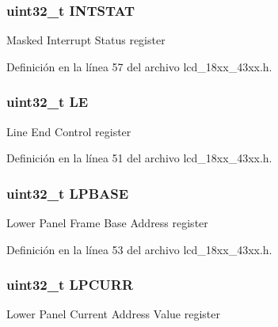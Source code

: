 \subsubsection[{\texorpdfstring{I\+N\+T\+S\+T\+AT}{INTSTAT}}]{ uint32\+\_\+t I\+N\+T\+S\+T\+AT}\hypertarget{struct_l_p_c___l_c_d___t_a0bbac120700e7e8084acf696d17068ab}{}\label{struct_l_p_c___l_c_d___t_a0bbac120700e7e8084acf696d17068ab}
Masked Interrupt Status register 

Definición en la línea 57 del archivo lcd\+\_\+18xx\+\_\+43xx.\+h.

\subsubsection[{\texorpdfstring{LE}{LE}}]{ uint32\+\_\+t LE}\hypertarget{struct_l_p_c___l_c_d___t_a69fb257295a9a84932b30501743003c2}{}\label{struct_l_p_c___l_c_d___t_a69fb257295a9a84932b30501743003c2}
Line End Control register 

Definición en la línea 51 del archivo lcd\+\_\+18xx\+\_\+43xx.\+h.

\subsubsection[{\texorpdfstring{L\+P\+B\+A\+SE}{LPBASE}}]{ uint32\+\_\+t L\+P\+B\+A\+SE}\hypertarget{struct_l_p_c___l_c_d___t_a08137395313747cdc86061a6b242a4ca}{}\label{struct_l_p_c___l_c_d___t_a08137395313747cdc86061a6b242a4ca}
Lower Panel Frame Base Address register 

Definición en la línea 53 del archivo lcd\+\_\+18xx\+\_\+43xx.\+h.

\subsubsection[{\texorpdfstring{L\+P\+C\+U\+RR}{LPCURR}}]{ uint32\+\_\+t L\+P\+C\+U\+RR}\hypertarget{struct_l_p_c___l_c_d___t_a0ce5ebd5ae89cd703debd78996090332}{}\label{struct_l_p_c___l_c_d___t_a0ce5ebd5ae89cd703debd78996090332}
Lower Panel Current Address Value register 

